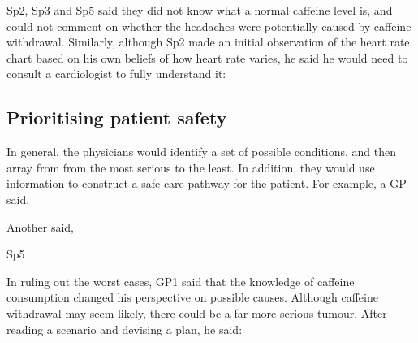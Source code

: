 \documentclass{sigchi}
\begin{document}
Sp2, Sp3 and Sp5 said they did not know what a normal caffeine level is, and could not comment on whether the headaches were potentially caused by caffeine withdrawal. Similarly, although Sp2 made an initial observation of the heart rate chart based on his own beliefs of how heart rate varies, he said he would need to consult a cardiologist to fully understand it:


\subsection{Prioritising patient safety}

In general, the physicians would identify a set of possible conditions, and then array from from the most serious to the least.  In addition, they would use information to construct a safe care pathway for the patient.  For example, a GP said,


Another said,


 {Sp5}


In ruling out the worst cases, GP1 said that the knowledge of caffeine consumption changed his perspective on possible causes.  Although caffeine withdrawal may seem likely, there could be a far more serious tumour. After reading a scenario and devising a plan, he said:
\end{document}
